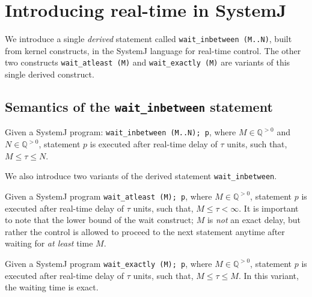 \section{Introducing real-time in SystemJ}
\label{sec:intr-real-time}

We introduce a single \textit{derived} statement called
\mbox{\texttt{wait\_inbetween (M..N)}}, built from kernel constructs, in
the SystemJ language for real-time control. The other two constructs
\mbox{\texttt{wait\_atleast (M)}} and \mbox{\texttt{wait\_exactly (M)}}
are variants of this single derived construct.



\subsection{Semantics of the \texttt{wait\_inbetween} statement}
\label{sec:semant-delay-stat}


Given a SystemJ program: \texttt{wait\_inbetween (M..N); p}, where $M
\in \mathbb{Q}^{>0}$ and $N \in \mathbb{Q}^{>0}$, statement $p$ is
executed after real-time delay of $\tau$ units, such that, $M \leq \tau
\leq N$.

We also introduce two variants of the derived statement
\texttt{wait\_inbetween}.
\begin{enumerate*}
\item Given a SystemJ program \texttt{wait\_atleast (M); p}, where $M
  \in \mathbb{Q}^{>0}$, statement $p$ is executed after real-time delay
  of $\tau$ units, such that, $M \leq \tau < \infty$. It is important to
  note that the lower bound of the wait construct; $M$ is \textit{not}
  an exact delay, but rather the control is allowed to proceed to the
  next statement anytime after waiting for \textit{at least} time $M$.
\item Given a SystemJ program \texttt{wait\_exactly (M); p}, where $M
  \in \mathbb{Q}^{>0}$, statement $p$ is executed after real-time delay
  of $\tau$ units, such that, $M \leq \tau \leq M$. In this variant, the
  waiting time is exact.
\end{enumerate*}

